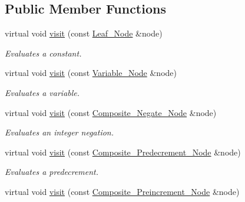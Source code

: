 \subsection*{Public Member Functions}
\begin{DoxyCompactItemize}
\item 
virtual void \hyperlink{classMadara_1_1Expression__Tree_1_1Evaluation__Visitor_af3664b440fe01d28eaff2f18653aaa99}{visit} (const \hyperlink{classMadara_1_1Expression__Tree_1_1Leaf__Node}{Leaf\_\-Node} \&node)
\begin{DoxyCompactList}\small\item\em Evaluates a constant. \item\end{DoxyCompactList}\item 
virtual void \hyperlink{classMadara_1_1Expression__Tree_1_1Evaluation__Visitor_afa8a63ef42dc63aaff316a96c01f0878}{visit} (const \hyperlink{classMadara_1_1Expression__Tree_1_1Variable__Node}{Variable\_\-Node} \&node)
\begin{DoxyCompactList}\small\item\em Evaluates a variable. \item\end{DoxyCompactList}\item 
virtual void \hyperlink{classMadara_1_1Expression__Tree_1_1Evaluation__Visitor_a0a2a5d3acba1febec3ccc2b6f5789322}{visit} (const \hyperlink{classMadara_1_1Expression__Tree_1_1Composite__Negate__Node}{Composite\_\-Negate\_\-Node} \&node)
\begin{DoxyCompactList}\small\item\em Evaluates an integer negation. \item\end{DoxyCompactList}\item 
virtual void \hyperlink{classMadara_1_1Expression__Tree_1_1Evaluation__Visitor_a4aa350f8b8abaaae00e164c54fac3c57}{visit} (const \hyperlink{classMadara_1_1Expression__Tree_1_1Composite__Predecrement__Node}{Composite\_\-Predecrement\_\-Node} \&node)
\begin{DoxyCompactList}\small\item\em Evaluates a predecrement. \item\end{DoxyCompactList}\item 
virtual void \hyperlink{classMadara_1_1Expression__Tree_1_1Evaluation__Visitor_a684fd1145e81d16a5cafe716c98d61d3}{visit} (const \hyperlink{classMadara_1_1Expression__Tree_1_1Composite__Preincrement__Node}{Composite\_\-Preincrement\_\-Node} \&node)

\end{DoxyCompactItemize}
